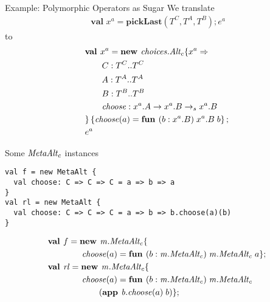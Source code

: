 \documentclass{beamer}
\begin{document}
\begin{frame}[fragile]{Example: Polymorphic Operators as Sugar}
We translate
\begin{align*}
\textbf{val } x^a = \textbf{pickLast}(T^C, T^A, T^B); e^a
\end{align*}
to
\begin{align*}
&\textbf{val }x^a = \textbf{new }\mathit{choices.Alt_c} \{x^a \Rightarrow \\
&\quad\quad C : T^C..T^C\\
&\quad\quad A : T^A..T^A\\
&\quad\quad B : T^B..T^B\\
&\quad\quad\mathit{choose} : x^a.A \rightarrow x^a.B\rightarrow_sx^a.B\\
& \}\left\{\mathit{choose}(a)=\textbf{fun } (b:x^a.B)\;x^a.B\;b\right\} ;\;\\&e^a
\end{align*}
\end{frame}

\begin{frame}[fragile]{Some ${\mathit{MetaAlt_c}}$ instances}
\begin{verbatim}
val f = new MetaAlt {
  val choose: C => C => C = a => b => a
}
val rl = new MetaAlt {
  val choose: C => C => C = a => b => b.choose(a)(b)
}
\end{verbatim}
\begin{align*}
&\mlnew f {{\mi{m.MetaAlt_c}}\mlldefs{\\
&\gap\gap\mi{choose}(a)=\fun b {\mi{m.MetaAlt_c}} {\mi{m.MetaAlt_c}} a}}{
\mlnew {\mi{rl}} {{\mi{m.MetaAlt_c}}\mlldefs{\\
&\gap\gap\mi{choose}(a)=\fun b {\mi{m.MetaAlt_c}} {\mi{m.MetaAlt_c}} {\\
&\gap\gap\gap \app {{\mi{b.choose}}(a)} b}}}{
}}
\end{align*}
\end{frame}
\end{document}
